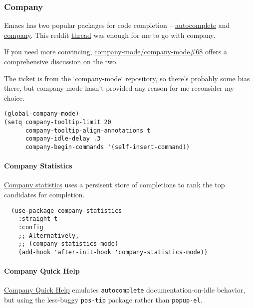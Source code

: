 \documentclass[11pt]{article}
\begin{document}
\subsubsection*{Company}
\label{sec:orgb36c712}

Emacs has two popular packages for code completion --
\href{https://github.com/auto-complete/auto-complete}{autocomplete} and \href{https://github.com/company-mode/company-mode}{company}. This reddit \href{https://www.reddit.com/r/emacs/comments/2ekw22/autocompletemode\_vs\_companymode\_which\_is\_better/}{thread} was enough for
me to go with company.

If you need more convincing, \href{https://github.com/company-mode/company-mode/issues/68}{company-mode/company-mode\#68}
offers a comprehensive discussion on the two.

The ticket is from the ‘company-mode‘ repository, so there's
probably some bias there, but company-mode hasn't provided
any reason for me reconsider my choice.

\begin{verbatim}
(global-company-mode)
(setq company-tooltip-limit 20
      company-tooltip-align-annotations t
      company-idle-delay .3
      company-begin-commands '(self-insert-command))
\end{verbatim}

\paragraph*{Company Statistics}
\label{sec:org6ade7f2}

\href{https://github.com/company-mode/company-statistics}{Company statistics} uses a persisent store of completions to rank the
top candidates for completion.

\begin{verbatim}
  (use-package company-statistics
    :straight t
    :config
    ;; Alternatively,
    ;; (company-statistics-mode)
    (add-hook 'after-init-hook 'company-statistics-mode))
\end{verbatim}

\paragraph*{Company Quick Help}
\label{sec:org2a6afa7}

\href{https://github.com/expez/company-quickhelp}{Company Quick Help} emulates \texttt{autocomplete} documentation-on-idle behavior, but using the
less-buggy \texttt{pos-tip} package rather than \texttt{popup-el}.
\end{document}
